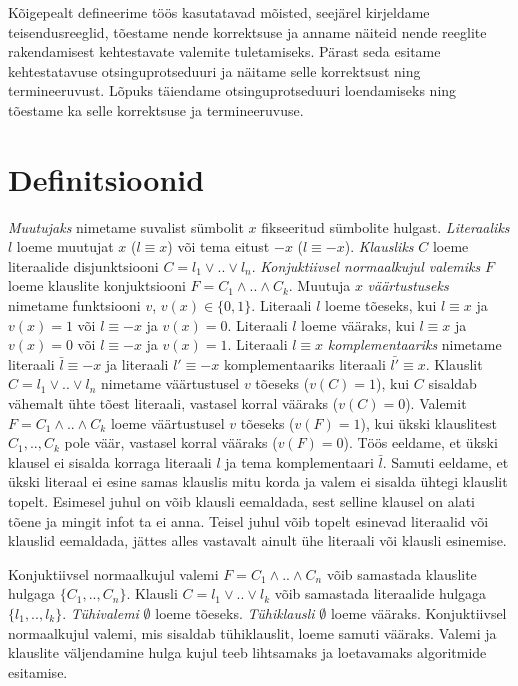\documentclass[12pt,estonian]{report}
\begin{document}
Kõigepealt defineerime töös kasutatavad mõisted, seejärel kirjeldame
teisendusreeglid, tõestame nende korrektsuse ja anname näiteid nende
reeglite rakendamisest kehtestavate valemite tuletamiseks.
Pärast seda esitame kehtestatavuse otsinguprotseduuri
ja näitame selle korrektsust ning termineeruvust.
Lõpuks täiendame otsinguprotseduuri loendamiseks ning
tõestame ka selle korrektsuse ja termineeruvuse.


\section*{Definitsioonid}

\emph{Muutujaks} \emph{}nimetame suvalist sümbolit $x$ fikseeritud sümbolite
hulgast. \emph{Literaaliks} $l$ loeme muutujat $x$ ($l\equiv x$) või tema
eitust $-x$ ($l\equiv-x$). \emph{Klausliks} $C$ loeme literaalide disjunktsiooni
$C=l_{1}\vee..\vee l_{n}$. \emph{Konjuktiivsel normaalkujul valemiks} $F$
loeme klauslite konjuktsiooni $F=C_{1}\wedge..\wedge C_{k}$. Muutuja
$x$ \emph{väärtustuseks} nimetame funktsiooni $v$, $v(x)\in\{0,1\}$. Literaali
$l$ loeme tõeseks, kui $l\equiv x$ ja $v(x)=1$ või $l\equiv-x$
ja $v(x)=0$. Literaali $l$ loeme vääraks, kui $l\equiv x$ ja $v(x)=0$
või $l\equiv-x$ ja $v(x)=1$. Literaali $l\equiv x$ \emph{komplementaariks}
nimetame literaali $\bar{l}\equiv-x$ ja literaali $l'\equiv -x$ komplementaariks
literaali $\bar{l'}\equiv x$. Klauslit $C=l_{1}\vee..\vee l_{n}$
nimetame väärtustusel $v$ tõeseks ($v(C)=1$), kui $C$ sisaldab
vähemalt ühte tõest literaali, vastasel korral vääraks ($v(C)=0$).
Valemit $F=C_{1}\wedge..\wedge C_{k}$ loeme väärtustusel $v$ tõeseks
($v(F)=1$), kui ükski klauslitest $C_{1},..,C_{k}$ pole väär, vastasel
korral vääraks ($v(F)=0$). Töös eeldame, et ükski klausel ei sisalda
korraga literaali $l$ ja tema komplementaari $\bar{l}$. Samuti eeldame,
et ükski literaal ei esine samas klauslis mitu korda ja valem ei sisalda
ühtegi klauslit topelt. Esimesel juhul on võib klausli eemaldada, sest
selline klausel on alati tõene ja mingit infot ta ei anna. Teisel juhul
võib topelt esinevad literaalid või klauslid eemaldada, jättes alles
vastavalt ainult ühe literaali või klausli esinemise.

Konjuktiivsel normaalkujul valemi $F=C_{1}\wedge..\wedge C_{n}$
võib samastada klauslite hulgaga $\{ C_{1},..,C_{n}\}$. Klausli $C=l_{1}\vee..\vee l_{k}$
võib samastada literaalide hulgaga $\{ l_{1},..,l_{k}\}$. \emph{Tühivalemi}
$\emptyset$ loeme tõeseks. \emph{Tühiklausli} $\emptyset$ loeme vääraks.
Konjuktiivsel normaalkujul valemi, mis sisaldab tühiklauslit, loeme
samuti vääraks. Valemi ja klauslite väljendamine hulga kujul teeb
lihtsamaks ja loetavamaks algoritmide esitamise.
\end{document}
